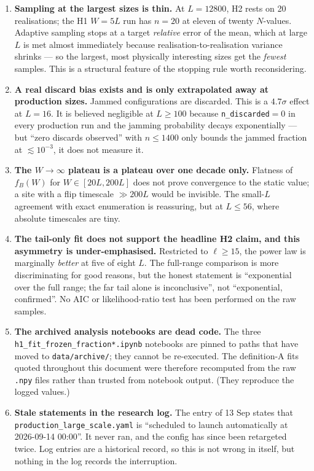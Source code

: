 \documentclass[11pt,a4paper]{article}
\begin{document}
\begin{enumerate}
\item \textbf{Sampling at the largest sizes is thin.} At $L=12800$, H2 rests
on 20 realisations; the H1 $W=5L$ run has $n=20$ at eleven of twenty
$N$-values. Adaptive sampling stops at a target \emph{relative} error of the
mean, which at large $L$ is met almost immediately because
realisation-to-realisation variance shrinks --- so the largest, most
physically interesting sizes get the \emph{fewest} samples. This is a
structural feature of the stopping rule worth reconsidering.

\item \textbf{A real discard bias exists and is only extrapolated away at
production sizes.} Jammed configurations are discarded. This is a
$4.7\sigma$ effect at $L=16$. It is believed negligible at $L\ge100$
because \texttt{n\_discarded}$=0$ in every production run and the jamming
probability decays exponentially --- but ``zero discards observed'' with
$n\le1400$ only bounds the jammed fraction at ${\lesssim}10^{-3}$, it does
not measure it.

\item \textbf{The $W\to\infty$ plateau is a plateau over one decade only.}
Flatness of $f_B(W)$ for $W\in[20L,200L]$ does not prove convergence to the
static value; a site with a flip timescale $\gg200L$ would be invisible. The
small-$L$ agreement with exact enumeration is reassuring, but at $L\le56$,
where absolute timescales are tiny.

\item \textbf{The tail-only fit does not support the headline H2 claim, and
this asymmetry is under-emphasised.} Restricted to $\ell\ge15$, the power
law is marginally \emph{better} at five of eight $L$. The full-range
comparison is more discriminating for good reasons, but the honest
statement is ``exponential over the full range; the far tail alone is
inconclusive'', not ``exponential, confirmed''. No AIC or likelihood-ratio
test has been performed on the raw samples.

\item \textbf{The archived analysis notebooks are dead code.} The three
\texttt{h1\_fit\_frozen\_fraction*.ipynb} notebooks are pinned to paths that
have moved to \texttt{data/archive/}; they cannot be re-executed. The
definition-A fits quoted throughout this document were therefore recomputed
from the raw \texttt{.npy} files rather than trusted from notebook output.
(They reproduce the logged values.)

\item \textbf{Stale statements in the research log.} The entry of 13 Sep
states that \texttt{production\_large\_scale.yaml} is ``scheduled to launch
automatically at 2026-09-14 00:00''. It never ran, and the config has since
been retargeted twice. Log entries are a historical record, so this is not
wrong in itself, but nothing in the log records the interruption.


\end{enumerate}
\end{document}
